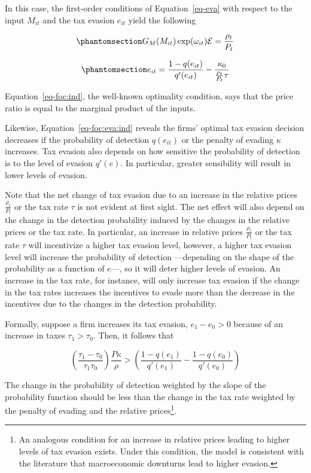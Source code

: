 \documentclass[
  12pt]{article}
\theoremstyle{definition}
\theoremstyle{remark}
\begin{document}
In this case, the first-order conditions of Equation~\ref{eq-eva} with
respect to the input \(M_{it}\) and the tax evasion \(e_{it}\) yield the
following

\begin{equation}\phantomsection\label{eq-foc:ind}{
G_M(M_{it})\exp(\omega_{it})\mathcal{E}=\frac{\rho_{t}}{P_t}
}\end{equation}

\begin{equation}\phantomsection\label{eq-foc:eva:ind}{
e_{it}=\frac{1-q(e_{it})}{q'(e_{it})}-\frac{\kappa_0}{\frac{\rho_{t}}{P_t}\tau}
}\end{equation}

Equation~\ref{eq-foc:ind}, the well-known optimality condition, says
that the price ratio is equal to the marginal product of the inputs.

Likewise, Equation~\ref{eq-foc:eva:ind} reveals the firms' optimal tax
evasion decision decreases if the probability of detection \(q(e_{it})\)
or the penalty of evading \(\kappa\) increases. Tax evasion also depends
on how sensitive the probability of detection is to the level of evasion
\(q'(e)\). In particular, greater sensibility will result in lower
levels of evasion.

Note that the net change of tax evasion due to an increase in the
relative prices \(\frac{\rho_{t}}{P_t}\) or the tax rate \(\tau\) is not
evident at first sight. The net effect will also depend on the change in
the detection probability induced by the changes in the relative prices
or the tax rate. In particular, an increase in relative prices
\(\frac{\rho_{t}}{P_t}\) or the tax rate \(\tau\) will incentivize a
higher tax evasion level, however, a higher tax evasion level will
increase the probability of detection ---depending on the shape of the
probability as a function of \(e\)---, so it will deter higher levels of
evasion. An increase in the tax rate, for instance, will only increase
tax evasion if the change in the tax rates increases the incentives to
evade more than the decrease in the incentives due to the changes in the
detection probability.

Formally, suppose a firm increases its tax evasion, \(e_1-e_0>0\)
because of an increase in taxes \(\tau_1>\tau_0\). Then, it follows that

\[
\left(\frac{\tau_1-\tau_0}{\tau_1\tau_0}\right)\frac{P\kappa}{\rho}>
  \left(\frac{1-q(e_1)}{q'(e_1)}-\frac{1-q(e_0)}{q'(e_0)}\right)
\]

The change in the probability of detection weighted by the slope of the
probability function should be less than the change in the tax rate
weighted by the penalty of evading and the relative prices\footnote{An
  analogous condition for an increase in relative prices leading to
  higher levels of tax evasion exists. Under this condition, the model
  is consistent with the literature that macroeconomic downturns lead to
  higher evasion.}.
\end{document}
